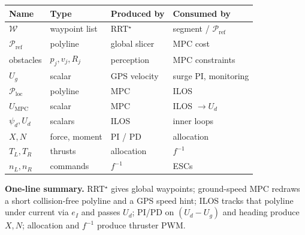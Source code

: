 \documentclass[11pt,a4paper]{article}
\begin{document}
\begin{table}[h]
\centering
\small
\begin{tabular}{@{}llll@{}}
\toprule
Name & Type & Produced by & Consumed by \\
\midrule
$\mathcal{W}$ & waypoint list & RRT$^\star$ & segment / $\mathcal{P}_{\mathrm{ref}}$ \\
$\mathcal{P}_{\mathrm{ref}}$ & polyline & global slicer & MPC cost \\
obstacles & $p_j,v_j,R_j$ & perception & MPC constraints \\
$U_g$ & scalar & GPS velocity & surge PI, monitoring \\
$\mathcal{P}_{\mathrm{loc}}$ & polyline & MPC & ILOS \\
$U_{\mathrm{MPC}}$ & scalar & MPC & ILOS $\to U_d$ \\
$\psi_d,U_d$ & scalars & ILOS & inner loops \\
$X,N$ & force, moment & PI / PD & allocation \\
$T_L,T_R$ & thrusts & allocation & $f^{-1}$ \\
$n_L,n_R$ & commands & $f^{-1}$ & ESCs \\
\bottomrule
\end{tabular}
\end{table}

\vspace{0.5em}
\noindent
\textbf{One-line summary.}
RRT$^\star$ gives global waypoints;
ground-speed MPC redraws a short collision-free polyline and a GPS speed hint;
ILOS tracks that polyline under current via \(e_I\) and passes \(U_d\);
PI/PD on \((U_d-U_g)\) and heading produce \(X,N\);
allocation and \(f^{-1}\) produce thruster PWM.
\end{document}
